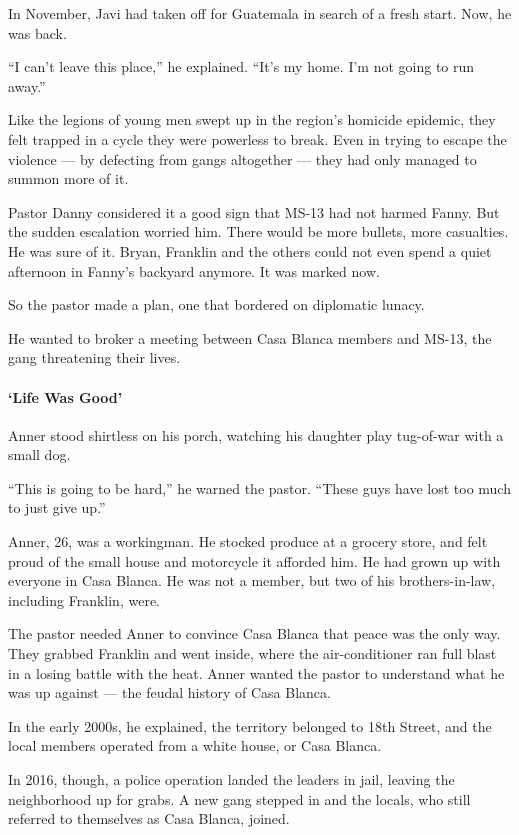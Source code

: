 In November, Javi had taken off for Guatemala in search of a fresh
start. Now, he was back.

``I can't leave this place,'' he explained. ``It's my home. I'm not
going to run away.''

Like the legions of young men swept up in the region's homicide
epidemic, they felt trapped in a cycle they were powerless to break.
Even in trying to escape the violence --- by defecting from gangs
altogether --- they had only managed to summon more of it.

Pastor Danny considered it a good sign that MS-13 had not harmed Fanny.
But the sudden escalation worried him. There would be more bullets, more
casualties. He was sure of it. Bryan, Franklin and the others could not
even spend a quiet afternoon in Fanny's backyard anymore. It was marked
now.

So the pastor made a plan, one that bordered on diplomatic lunacy.

He wanted to broker a meeting between Casa Blanca members and MS-13, the
gang threatening their lives.

\hypertarget{life-was-good}{%
\paragraph{`Life Was Good'}\label{life-was-good}}

Anner stood shirtless on his porch, watching his daughter play
tug-of-war with a small dog.

``This is going to be hard,'' he warned the pastor. ``These guys have
lost too much to just give up.''

Anner, 26, was a workingman. He stocked produce at a grocery store, and
felt proud of the small house and motorcycle it afforded him. He had
grown up with everyone in Casa Blanca. He was not a member, but two of
his brothers-in-law, including Franklin, were.

The pastor needed Anner to convince Casa Blanca that peace was the only
way. They grabbed Franklin and went inside, where the air-conditioner
ran full blast in a losing battle with the heat. Anner wanted the pastor
to understand what he was up against --- the feudal history of Casa
Blanca.

In the early 2000s, he explained, the territory belonged to 18th Street,
and the local members operated from a white house, or Casa Blanca.

In 2016, though, a police operation landed the leaders in jail, leaving
the neighborhood up for grabs. A new gang stepped in and the locals, who
still referred to themselves as Casa Blanca, joined.

